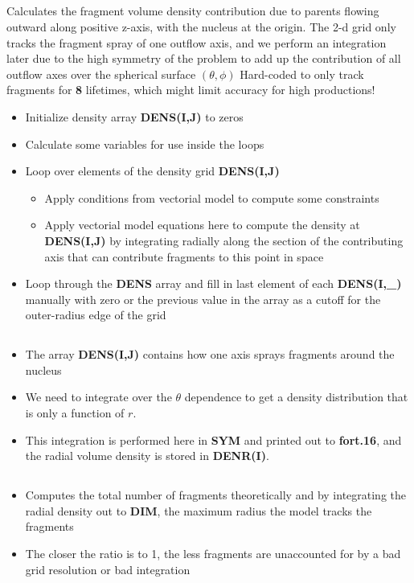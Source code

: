 \documentclass[11pt]{article}
\newcommand{\problempart}[1]{\subsection*{\contour{mybblack}{\textcolor{myblack}{#1}}}}
\newcommand{\fortranfile}[1]{\textcolor{myred}{\textbf{#1}}}
\newcommand{\fortranvar}[1]{\textcolor{myblue}{\textbf{#1}}}
\newcommand{\magicnumber}[1]{\textcolor{myred}{\textbf{#1}}}
\begin{document}
\problempart{Function SDENT - Volume Density Grid Calculation}
Calculates the fragment volume density contribution due to parents flowing outward along positive z-axis, with the nucleus at the origin.
The 2-d grid only tracks the fragment spray of one outflow axis, and we perform an integration later due to the high symmetry of the problem to add up the contribution of all outflow axes over the spherical surface \((\theta, \phi)\)
Hard-coded to only track fragments for \magicnumber{8} lifetimes, which might limit accuracy for high productions!

\begin{itemize}
    \item Initialize density array \fortranvar{DENS(I,J)} to zeros
    \item Calculate some variables for use inside the loops
    \item Loop over elements of the density grid \fortranvar{DENS(I,J)}
        \begin{itemize}
            \item Apply conditions from vectorial model to compute some constraints
            \item Apply vectorial model equations here to compute the density at \fortranvar{DENS(I,J)} by integrating radially along the section of the contributing axis that can contribute fragments to this point in space
        \end{itemize}
    \item Loop through the \fortranvar{DENS} array and fill in last element of each \fortranvar{DENS(I,\_)} manually with zero or the previous value in the array as a cutoff for the outer-radius edge of the grid
\end{itemize}

\problempart{Function SYM - Angular Integration for Radial Density}
\begin{itemize}
    \item The array \fortranvar{DENS(I,J)} contains how one axis sprays fragments around the nucleus
    \item We need to integrate over the \(\theta\) dependence to get a density distribution that is only a function of \(r\).
    \item This integration is performed here in \fortranvar{SYM} and printed out to \fortranfile{fort.16}, and the radial volume density is stored in \fortranvar{DENR(I)}.
\end{itemize}

\problempart{Function VERIF - Counting Fragment Species}
\begin{itemize}
    \item Computes the total number of fragments theoretically and by integrating the radial density out to \fortranvar{DIM}, the maximum radius the model tracks the fragments
    \item The closer the ratio is to 1, the less fragments are unaccounted for by a bad grid resolution or bad integration
\end{itemize}
\end{document}
